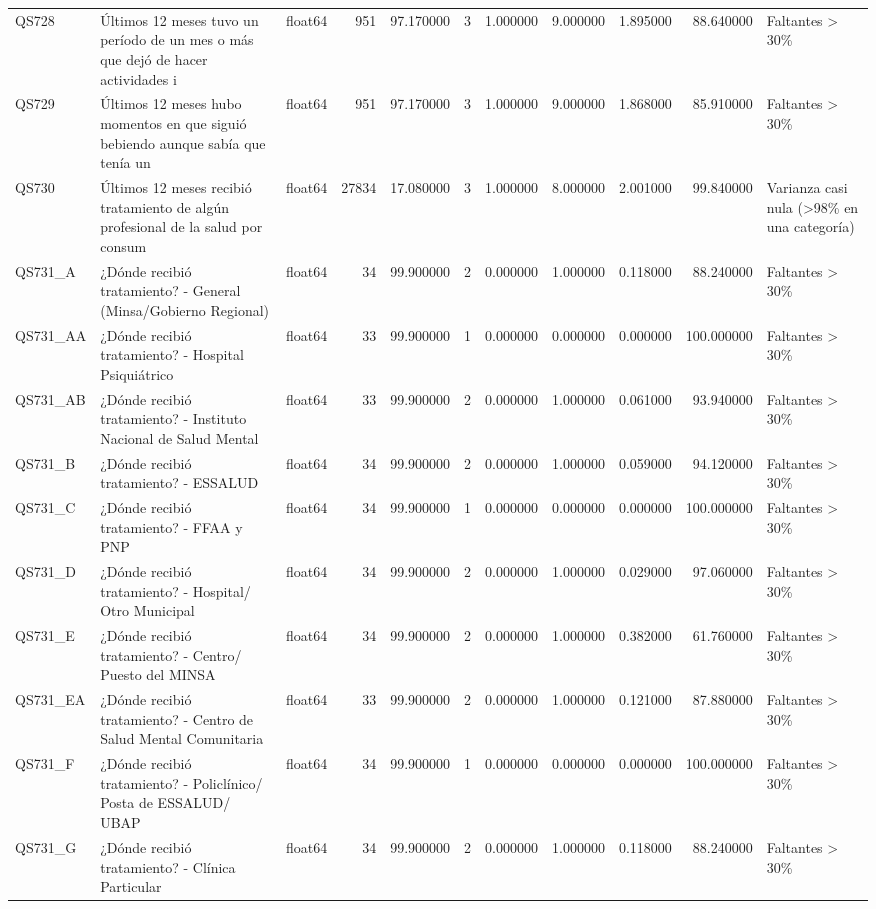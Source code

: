 \begin{longtable}{lllrrrrrrrl}
QS728 & Últimos 12 meses tuvo un período de un mes o más que dejó de hacer actividades i & float64 & 951 & 97.170000 & 3 & 1.000000 & 9.000000 & 1.895000 & 88.640000 & Faltantes > 30\% \\
QS729 & Últimos 12 meses hubo momentos en que siguió bebiendo aunque sabía que tenía un  & float64 & 951 & 97.170000 & 3 & 1.000000 & 9.000000 & 1.868000 & 85.910000 & Faltantes > 30\% \\
QS730 & Últimos 12 meses recibió tratamiento de algún profesional de la salud por consum & float64 & 27834 & 17.080000 & 3 & 1.000000 & 8.000000 & 2.001000 & 99.840000 & Varianza casi nula (>98\% en una categoría) \\
QS731\_A & ¿Dónde recibió tratamiento? - General (Minsa/Gobierno Regional) & float64 & 34 & 99.900000 & 2 & 0.000000 & 1.000000 & 0.118000 & 88.240000 & Faltantes > 30\% \\
QS731\_AA & ¿Dónde recibió tratamiento? -  Hospital Psiquiátrico & float64 & 33 & 99.900000 & 1 & 0.000000 & 0.000000 & 0.000000 & 100.000000 & Faltantes > 30\% \\
QS731\_AB & ¿Dónde recibió tratamiento? -  Instituto Nacional de Salud Mental & float64 & 33 & 99.900000 & 2 & 0.000000 & 1.000000 & 0.061000 & 93.940000 & Faltantes > 30\% \\
QS731\_B & ¿Dónde recibió tratamiento? - ESSALUD & float64 & 34 & 99.900000 & 2 & 0.000000 & 1.000000 & 0.059000 & 94.120000 & Faltantes > 30\% \\
QS731\_C & ¿Dónde recibió tratamiento? - FFAA y PNP & float64 & 34 & 99.900000 & 1 & 0.000000 & 0.000000 & 0.000000 & 100.000000 & Faltantes > 30\% \\
QS731\_D & ¿Dónde recibió tratamiento? -  Hospital/ Otro Municipal & float64 & 34 & 99.900000 & 2 & 0.000000 & 1.000000 & 0.029000 & 97.060000 & Faltantes > 30\% \\
QS731\_E & ¿Dónde recibió tratamiento? -  Centro/ Puesto del MINSA & float64 & 34 & 99.900000 & 2 & 0.000000 & 1.000000 & 0.382000 & 61.760000 & Faltantes > 30\% \\
QS731\_EA & ¿Dónde recibió tratamiento? -  Centro de Salud Mental Comunitaria & float64 & 33 & 99.900000 & 2 & 0.000000 & 1.000000 & 0.121000 & 87.880000 & Faltantes > 30\% \\
QS731\_F & ¿Dónde recibió tratamiento? -  Policlínico/ Posta de ESSALUD/ UBAP & float64 & 34 & 99.900000 & 1 & 0.000000 & 0.000000 & 0.000000 & 100.000000 & Faltantes > 30\% \\
QS731\_G & ¿Dónde recibió tratamiento? -  Clínica Particular & float64 & 34 & 99.900000 & 2 & 0.000000 & 1.000000 & 0.118000 & 88.240000 & Faltantes > 30\% \\

\end{longtable}
